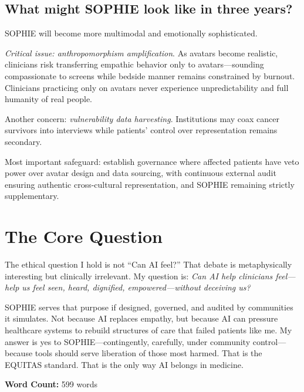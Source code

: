 \documentclass[12pt,twoside]{article}
\begin{document}
\subsection*{What might SOPHIE look like in three years?}

SOPHIE will become more multimodal and emotionally sophisticated.

\emph{Critical issue: anthropomorphism amplification}. As avatars become realistic, clinicians risk transferring empathic behavior only to avatars—sounding compassionate to screens while bedside manner remains constrained by burnout. Clinicians practicing only on avatars never experience unpredictability and full humanity of real people.

Another concern: \emph{vulnerability data harvesting}. Institutions may coax cancer survivors into interviews while patients' control over representation remains secondary.

Most important safeguard: establish governance where affected patients have veto power over avatar design and data sourcing, with continuous external audit ensuring authentic cross-cultural representation, and SOPHIE remaining strictly supplementary.

\section*{The Core Question}

The ethical question I hold is not \enquote{Can AI feel?} That debate is metaphysically interesting but clinically irrelevant. My question is: \emph{Can AI help clinicians feel—help us feel seen, heard, dignified, empowered—without deceiving us?}

SOPHIE serves that purpose if designed, governed, and audited by communities it simulates. Not because AI replaces empathy, but because AI can pressure healthcare systems to rebuild structures of care that failed patients like me. My answer is yes to SOPHIE—contingently, carefully, under community control—because tools should serve liberation of those most harmed. That is the EQUITAS standard. That is the only way AI belongs in medicine.

\vfill
\noindent\centering\footnotesize\textbf{Word Count:} 599 words
\end{document}
